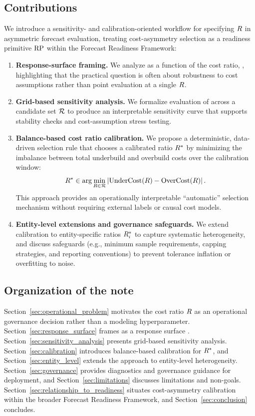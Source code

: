 \subsection{Contributions}
\label{subsec:contributions}

We introduce a sensitivity- and calibration-oriented workflow for specifying
$R{}$ in asymmetric forecast evaluation, treating cost-asymmetry selection as
a readiness primitive $\mathrm{RP}{}$ within the Forecast Readiness
Framework:

\begin{enumerate}[leftmargin=*]
    \item \textbf{Response-surface framing.}
    We analyze \CWSL{} as a function of the cost ratio, \CWSLR{}, highlighting that
    the practical question is often about robustness to cost assumptions rather
    than point evaluation at a single $R{}$.

    \item \textbf{Grid-based sensitivity analysis.}
    We formalize evaluation of \CWSL{} across a candidate set $\mathcal{R}$ to produce
    an interpretable sensitivity curve that supports stability checks and
    cost-assumption stress testing.

    \item \textbf{Balance-based cost ratio calibration.}
    We propose a deterministic, data-driven selection rule that chooses a
    calibrated ratio $R^{\ast}$ by minimizing the imbalance between total
    underbuild and overbuild costs over the calibration window:
    \[
        R^{\ast} \in  \arg\min_{R \in \mathcal{R}}\left|\mathrm{UnderCost}(R) - \mathrm{OverCost}(R)\right| .
    \]
    This approach provides an operationally interpretable ``automatic''
    selection mechanism without requiring external labels or causal cost models.

    \item \textbf{Entity-level extensions and governance safeguards.}
    We extend calibration to entity-specific ratios $R^{\ast}_{i}$ to capture systematic
    heterogeneity, and discuss safeguards (e.g., minimum sample requirements,
    capping strategies, and reporting conventions) to prevent tolerance inflation
    or overfitting to noise.
\end{enumerate}

\subsection{Organization of the note}
\label{subsec:organization}

Section~\ref{sec:operational_problem} motivates the cost ratio $R{}$ as an
operational governance decision rather than a modeling hyperparameter.
Section~\ref{sec:response_surface} frames \CWSL{} as a response surface \CWSLR{}.
Section~\ref{sec:sensitivity_analysis} presents grid-based sensitivity analysis.
Section~\ref{sec:calibration} introduces balance-based calibration for $R^{\ast}$,
and Section~\ref{sec:entity_level} extends the approach to entity-level
heterogeneity. Section~\ref{sec:governance} provides diagnostics and governance
guidance for deployment, and Section~\ref{sec:limitations} discusses limitations
and non-goals. Section~\ref{sec:relationship_to_readiness} situates cost-asymmetry
calibration within the broader Forecast Readiness Framework, and
Section~\ref{sec:conclusion} concludes.
